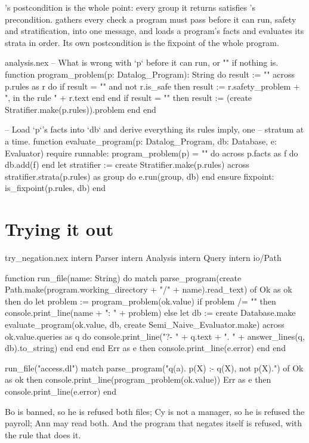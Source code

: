 's postcondition is the whole point: every group it returns
satisfies 's precondition.  gathers every
check a program must pass before it can run, safety and stratification, into
one message, and  loads a program's facts and
evaluates its strata in order. Its own postcondition is the fixpoint of the
whole program.

\begin{continued}{analysis.nex}
-- What is wrong with `p` before it can run, or "" if nothing is.
function program_problem(p: Datalog_Program): String
do
  result := ""
  across p.rules as r do
    if result = "" and not r.is_safe then
      result := r.safety_problem + ", in the rule " + r.text
    end
  end
  if result = "" then
    result := (create Stratifier.make(p.rules)).problem
  end
end

-- Load `p`'s facts into `db` and derive everything its rules imply, one
-- stratum at a time.
function evaluate_program(p: Datalog_Program, db: Database, e: Evaluator)
require
  runnable: program_problem(p) = ""
do
  across p.facts as f do
    db.add(f)
  end
  let stratifier := create Stratifier.make(p.rules)
  across stratifier.strata(p.rules) as group do
    e.run(group, db)
  end
ensure
  fixpoint: is_fixpoint(p.rules, db)
end
\end{continued}

\section{Trying it out}

\begin{tryit}{try_negation.nex}
intern Parser
intern Analysis
intern Query
intern io/Path

function run_file(name: String)
do
  match parse_program(create Path.make(program.working_directory + "/" + name).read_text) of
    Ok as ok then
      do
        let problem := program_problem(ok.value)
        if problem /= "" then
          console.print_line(name + ": " + problem)
        else
          let db := create Database.make
          evaluate_program(ok.value, db, create Semi_Naive_Evaluator.make)
          across ok.value.queries as q do
            console.print_line("?- " + q.text + ".   " + answer_lines(q, db).to_string)
          end
        end
      end
    Err as e then console.print_line(e.error)
  end
end

run_file("access.dl")
match parse_program("q(a). p(X) :- q(X), not p(X).") of
  Ok as ok then console.print_line(program_problem(ok.value))
  Err as e then console.print_line(e.error)
end
\end{tryit}

Bo is banned, so he is refused both files; Cy is not a manager, so he is
refused the payroll; Ann may read both. And the program that negates itself
is refused, with the rule that does it.
